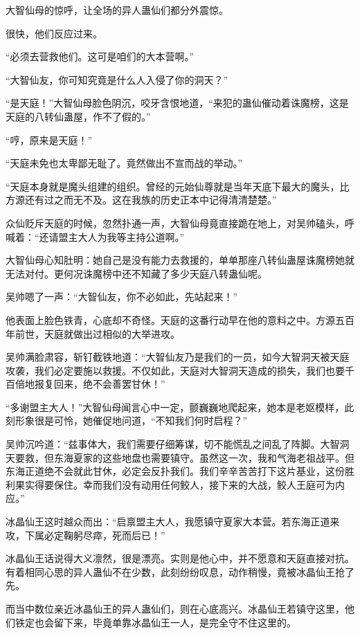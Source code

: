 
\begin{this_body}

大智仙母的惊呼，让全场的异人蛊仙们都分外震惊。

很快，他们反应过来。

“必须去营救他们。这可是咱们的大本营啊。”

“大智仙友，你可知究竟是什么人入侵了你的洞天？”

“是天庭！”大智仙母脸色阴沉，咬牙含恨地道，“来犯的蛊仙催动着诛魔榜，这是天庭的八转仙蛊屋，作不了假的。”

“哼，原来是天庭！”

“天庭未免也太卑鄙无耻了。竟然做出不宣而战的举动。”

“天庭本身就是魔头组建的组织。曾经的元始仙尊就是当年天底下最大的魔头，比方源还有过之而无不及。这在我族的历史正本中记得清清楚楚。”

众仙贬斥天庭的时候，忽然扑通一声，大智仙母竟直接跪在地上，对吴帅磕头，呼喊着：“还请盟主大人为我等主持公道啊。”

大智仙母心知肚明：她自己是没有能力去救援的，单单那座八转仙蛊屋诛魔榜她就无法对付。更何况诛魔榜中还不知藏了多少天庭八转蛊仙呢。

吴帅嗯了一声：“大智仙友，你不必如此，先站起来！”

他表面上脸色铁青，心底却不奇怪。天庭的这番行动早在他的意料之中。方源五百年前世，天庭就做出过相似的大举进攻。

吴帅满脸肃容，斩钉截铁地道：“大智仙友乃是我们的一员，如今大智洞天被天庭攻袭，我们必定要施以救援。不仅如此，天庭对大智洞天造成的损失，我们也要千百倍地报复回来，绝不会善罢甘休！”

“多谢盟主大人！”大智仙母闻言心中一定，颤巍巍地爬起来，她本是老妪模样，此刻形象很是可怜，她催促地问道，“不知我们何时启程？”

吴帅沉吟道：“兹事体大，我们需要仔细筹谋，切不能慌乱之间乱了阵脚。大智洞天要救，但东海夏家的这些地盘也需要镇守。虽然这一次，我和气海老祖战平。但东海正道绝不会就此甘休，必定会反扑我们。我们辛辛苦苦打下这片基业，这份胜利果实得要保住。幸而我们没有动用任何鲛人，接下来的大战，鲛人王庭可为内应。”

冰晶仙王这时越众而出：“启禀盟主大人，我愿镇守夏家大本营。若东海正道来攻，下属必定鞠躬尽瘁，死而后已！”

冰晶仙王话说得大义凛然，很是漂亮。实则是他心中，并不愿意和天庭直接对抗。有着相同心思的异人蛊仙不在少数，此刻纷纷叹息，动作稍慢，竟被冰晶仙王抢了先。

而当中数位亲近冰晶仙王的异人蛊仙们，则在心底高兴。冰晶仙王若镇守这里，他们铁定也会留下来，毕竟单靠冰晶仙王一人，是完全守不住这里的。


\end{this_body}
